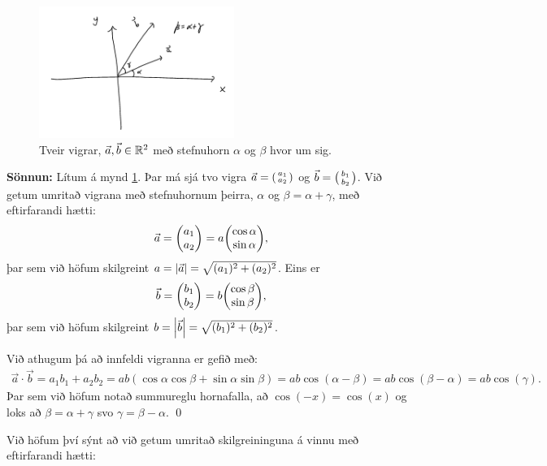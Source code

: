 \begin{minipage}{\linewidth}
\begin{figure}
\includegraphics[width=2.5in]{temp/vigrar.png}
\caption{Tveir vigrar, $\vec{a}, \vec{b} \in \mathbb{R}^2$ með stefnuhorn $\alpha$ og $\beta$ hvor um sig.}
\label{fig:ab-innfeldi}
\end{figure}


\textbf{Sönnun:} Lítum á mynd \ref{fig:ab-innfeldi}. Þar má sjá tvo vigra $\vec{a} = \smqty(a_1 \\ a_2)$ og $\vec{b} = \smqty(b_1 \\ b_2)$. Við getum umritað vigrana með stefnuhornum þeirra, $\alpha$ og $\beta = \alpha + \gamma$, með eftirfarandi hætti:
\begin{align*}
    \vec{a} = \mqty(a_1 \\ a_2) = a\mqty(\cos\alpha \\ \sin\alpha),
\end{align*}
þar sem við höfum skilgreint $a = \abs{\vec{a}} = \sqrt{(a_1)^2 + (a_2)^2}$. Eins er
\begin{align*}
    \vec{b} = \mqty(b_1 \\ b_2) = b \mqty(\cos\beta \\ \sin\beta),
\end{align*}
þar sem við höfum skilgreint $b = \abs{\vec{b}} = \sqrt{(b_1)^2 + (b_2)^2}$.
\end{minipage}


Við athugum þá að innfeldi vigranna er gefið með:
\begin{align*}
    \vec{a} \cdot \vec{b} = a_1 b_1 + a_2 b_2 = ab\left( \cos\alpha \cos\beta + \sin\alpha \sin\beta \right) = ab \cos(\alpha - \beta) = ab\cos(\beta - \alpha) = ab\cos(\gamma).
\end{align*}
Þar sem við höfum notað summureglu hornafalla, að $\cos(-x) = \cos(x)$ og loks að $\beta = \alpha + \gamma$ svo $\gamma = \beta - \alpha$. \qed

\newpage

Við höfum því sýnt að við getum umritað skilgreininguna á vinnu með eftirfarandi hætti:

